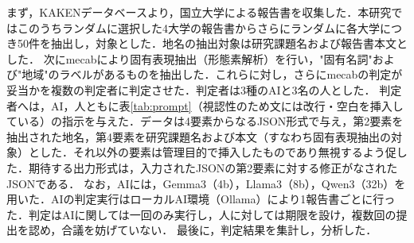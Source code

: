 まず，KAKENデータベース\cite{kaken1}より，国立大学による報告書を収集した．本研究ではこのうちランダムに選択した4大学の報告書からさらにランダムに各大学につき50件を抽出し，対象とした．地名の抽出対象は研究課題名および報告書本文とした．
次にmecab\cite{mecab}により固有表現抽出（形態素解析）を行い，"固有名詞"および"地域"のラベルがあるものを抽出した．これらに対し，さらにmecabの判定が妥当かを複数の判定者に判定させた．判定者は3種のAIと3名の人とした．
判定者へは，AI，人ともに表\ref{tab:prompt}（視認性のため文には改行・空白を挿入している）の指示を与えた．データは4要素からなるJSON形式で与え，第2要素を抽出された地名，第4要素を研究課題名および本文（すなわち固有表現抽出の対象）とした．それ以外の要素は管理目的で挿入したものであり無視するよう促した．期待する出力形式は，入力されたJSONの第2要素に対する修正がなされたJSONである．
なお，AIには，Gemma3（4b）\cite{gemma3}，Llama3（8b）\cite{llama3}，Qwen3（32b）\cite{qwen3}を用いた．AIの判定実行はローカルAI環境（Ollama\cite{ollama}）により1報告書ごとに行った．判定はAIに関しては一回のみ実行し，人に対しては期限を設け，複数回の提出を認め，合議を妨げていない．
最後に，判定結果を集計し，分析した．
